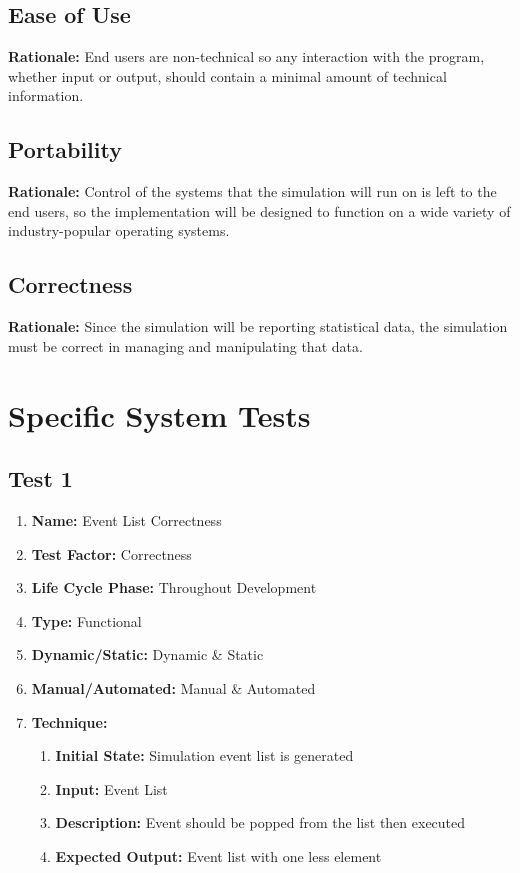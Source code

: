 \documentclass[paper=letter, fontsize=10pt]{scrartcl}
\numberwithin{equation}{section}		%
\numberwithin{figure}{section}			%
\numberwithin{table}{section}				%
\begin{document}
\subsection{Ease of Use}
\textbf{Rationale:} End users are non-technical so any interaction with the program, whether input or output, should contain a minimal amount of technical information.  
\subsection{Portability} 
\textbf{Rationale:} Control of the systems that the simulation will run on is left to the end users, so the implementation will be designed to function on a wide variety of industry-popular operating systems.
\subsection{Correctness}
\textbf{Rationale:} Since the simulation will be reporting statistical data, the simulation must be correct in managing and manipulating that data.  

\section{Specific System Tests}
\subsection{Test 1}
\begin{enumerate}[a]
	\item \textbf{Name:} Event List Correctness
	\item \textbf{Test Factor:} Correctness
	\item \textbf{Life Cycle Phase:} Throughout Development
	\item \textbf{Type:} Functional
	\item \textbf{Dynamic/Static:} Dynamic \& Static
	\item \textbf{Manual/Automated:} Manual \& Automated
	\item \textbf{Technique:} 
		\begin{enumerate}[i]
			\item \textbf{Initial State:} Simulation event list is generated			
			\item \textbf{Input:} Event List
			\item \textbf{Description:} Event should be popped from the list then executed  
			\item \textbf{Expected Output:} Event list with one less element
		\end{enumerate}
\end{enumerate}
\end{document}
